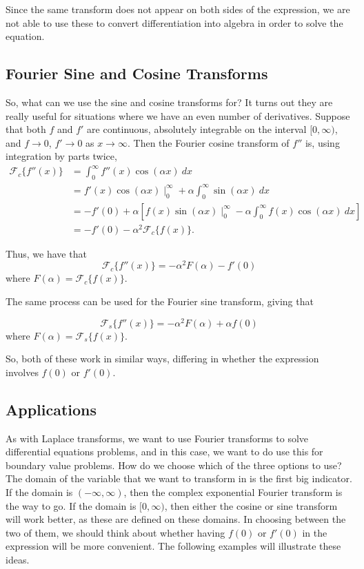 \documentclass{ximera}
\begin{document}
Since the same transform does not appear on both sides of the expression, we are not able to use these to convert differentiation into algebra in order to solve the equation. 

\subsection{Fourier Sine and Cosine Transforms}

So, what can we use the sine and cosine transforms for? It turns out they are really useful for situations where we have an even number of derivatives. Suppose that both $f$ and $f'$ are continuous, absolutely integrable on the interval $[0, \infty)$, and $f \rightarrow 0$, $f' \rightarrow 0$ as $x \rightarrow \infty$. Then the Fourier cosine transform of $f''$ is, using integration by parts twice, 
\[ 
    \begin{split}
        \mathcal{F}_c\{f''(x)\} &= \int_0^\infty f''(x) \cos(\alpha x)\ dx \\
        &= f'(x)\cos(\alpha x) \mid_0^\infty + \alpha \int_0^\infty \sin(\alpha x)\ dx \\
        &= -f'(0) + \alpha \left[ f(x) \sin(\alpha x) \mid_0^\infty - \alpha \int_0^\infty f(x) \cos(\alpha x)\ dx \right] \\
        &= -f'(0) - \alpha^2 \mathcal{F}_c\{f(x)\}.
    \end{split}
\]

Thus, we have that
\[ 
    \mathcal{F}_c\{f''(x)\} = -\alpha^2 F(\alpha) - f'(0) 
\] 
where $F(\alpha) = \mathcal{F}_c\{f(x)\}$. 

The same process can be used for the Fourier sine transform, giving that 

\[ 
    \mathcal{F}_s\{f''(x)\} = -\alpha^2 F(\alpha) + \alpha f(0) 
\] 
where $F(\alpha) = \mathcal{F}_s\{f(x)\}$. 

So, both of these work in similar ways, differing in whether the expression involves $f(0)$ or $f'(0)$.

\subsection{Applications}

As with Laplace transforms, we want to use Fourier transforms to solve differential equations problems, and in this case, we want to do use this for boundary value problems. How do we choose which of the three options to use? The domain of the variable that we want to transform in is the first big indicator. If the domain is $(-\infty, \infty)$, then the complex exponential Fourier transform is the way to go. If the domain is $[0, \infty)$, then either the cosine or sine transform will work better, as these are defined on these domains. In choosing between the two of them, we should think about whether having $f(0)$ or $f'(0)$ in the expression will be more convenient. The following examples will illustrate these ideas. 
\end{document}
